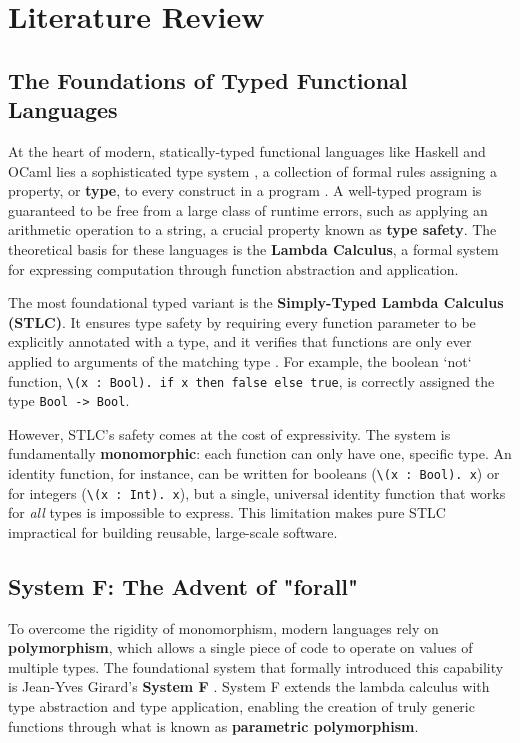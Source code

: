 \chapter{Literature Review}
\label{chap:LiteratureReview}

\section{The Foundations of Typed Functional Languages}
\label{sec:LitReviewFoundations}

At the heart of modern, statically-typed functional languages like Haskell and OCaml lies a sophisticated type system \cite{haskell-type-systems-research, ocaml-papers}, a collection of formal rules assigning a property, or \textbf{type}, to every construct in a program \cite{pierce-types-2002}. A well-typed program is guaranteed to be free from a large class of runtime errors, such as applying an arithmetic operation to a string, a crucial property known as \textbf{type safety}. The theoretical basis for these languages is the \textbf{Lambda Calculus}, a formal system for expressing computation through function abstraction and application.

The most foundational typed variant is the \textbf{Simply-Typed Lambda Calculus (STLC)}. It ensures type safety by requiring every function parameter to be explicitly annotated with a type, and it verifies that functions are only ever applied to arguments of the matching type \cite{Pierce-SF2}. For example, the boolean `not` function, \texttt{\textbackslash(x : Bool). if x then false else true}, is correctly assigned the type \texttt{Bool -> Bool}.

However, STLC's safety comes at the cost of expressivity. The system is fundamentally \textbf{monomorphic}: each function can only have one, specific type. An identity function, for instance, can be written for booleans (\texttt{\textbackslash(x : Bool). x}) or for integers (\texttt{\textbackslash(x : Int). x}), but a single, universal identity function that works for \textit{all} types is impossible to express. This limitation makes pure STLC impractical for building reusable, large-scale software.

\section{System F: The Advent of "forall"}
\label{chap:LiteratureReview:sec:PolymorphismAndSystemF}

To overcome the rigidity of monomorphism, modern languages rely on \textbf{polymorphism}, which allows a single piece of code to operate on values of multiple types. The foundational system that formally introduced this capability is Jean-Yves Girard's \textbf{System F} \cite{girard-system-f}. System F extends the lambda calculus with type abstraction and type application, enabling the creation of truly generic functions through what is known as \textbf{parametric polymorphism}.

